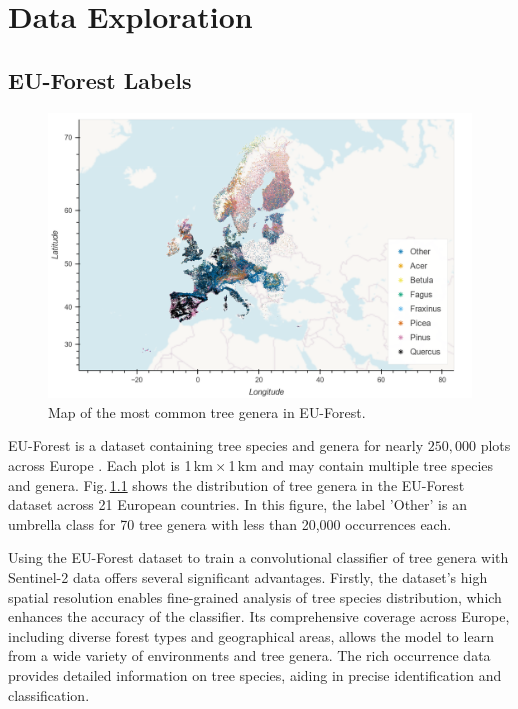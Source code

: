\chapter{Data Exploration}
\label{chapter:data}
\section{EU-Forest Labels}

\begin{figure}[!thb]
    \centering
    \includegraphics[width=0.9\linewidth]{figures/figures_labels/genus_cutoff_map.png}
    \caption{Map of the most common tree genera in EU-Forest.}
    \label{fig:genus_cutoff_map}
\end{figure}

EU-Forest is a dataset containing tree species and genera for nearly
$250,000$ plots across Europe \cite{eu_forest_data}. Each plot is 1\,km\,×\,1\,km
and may contain multiple tree species and genera.
Fig.\,\ref{fig:genus_cutoff_map} shows the distribution of tree genera in the EU-Forest dataset
across 21 European countries. In this figure, the label 'Other' is an umbrella class for 70 
tree genera with less than 20,000 occurrences each.

Using the EU-Forest dataset to train a convolutional classifier of tree genera with 
Sentinel-2 data offers several significant advantages. 
Firstly, the dataset's high spatial resolution enables fine-grained 
analysis of tree species distribution, which enhances the accuracy of the classifier. 
Its comprehensive coverage across Europe, including diverse forest types and geographical areas, 
allows the model to learn from a wide variety of environments and tree genera.
The rich occurrence data provides detailed information on tree species, 
aiding in precise identification and classification.


